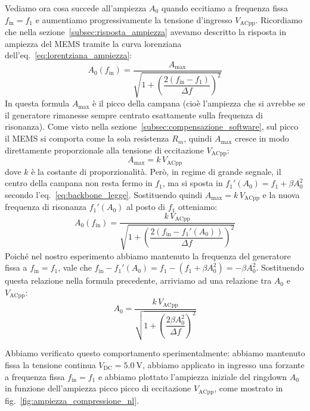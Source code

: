 \documentclass[11pt,a4paper]{article}
\begin{document}
\vspace{0.3cm}
\noindent Vediamo ora cosa succede all'ampiezza $A_0$ quando eccitiamo a frequenza fissa $f_{\text{in}} = f_1$ e aumentiamo progressivamente la tensione d'ingresso $V_{\text{ACpp}}$. Ricordiamo che nella sezione~\ref{subsec:risposta_ampiezza} avevamo descritto la risposta in ampiezza del MEMS tramite la curva lorenziana dell'eq.~\eqref{eq:lorentziana_ampiezza}:
\begin{equation}
    \label{eq:richiamo_lorentz_nl}
    A_0(f_{\text{in}}) = \frac{A_{\max}}{\sqrt{1 + \left( \dfrac{2(f_{\text{in}} - f_1)}{\Delta f} \right)^2}}
\end{equation}
In questa formula $A_{\max}$ è il picco della campana (cioè l'ampiezza che si avrebbe se il generatore rimanesse sempre centrato esattamente sulla frequenza di risonanza). Come visto nella sezione~\ref{subsec:compensazione_software}, sul picco il MEMS si comporta come la sola resistenza $R_m$, quindi $A_{\max}$ cresce in modo direttamente proporzionale alla tensione di eccitazione $V_{\text{ACpp}}$:
\begin{equation}
    \label{eq:amax_lineare_vac}
    A_{\max} = k \, V_{\text{ACpp}}
\end{equation}
dove $k$ è la costante di proporzionalità. Però, in regime di grande segnale, il centro della campana non resta fermo in $f_1$, ma si sposta in $f_1'(A_0) = f_1 + \beta A_0^2$ secondo l'eq.~\eqref{eq:backbone_legge}. Sostituendo quindi $A_{\max} = k \, V_{\text{ACpp}}$ e la nuova frequenza di risonanza $f_1'(A_0)$ al posto di $f_1$ otteniamo:
\begin{equation}
    A_0(f_{\text{in}}) = \frac{k \, V_{\text{ACpp}}}{\sqrt{1 + \left( \dfrac{2\left(f_{\text{in}} - f_1'(A_0)\right)}{\Delta f} \right)^2}}
\end{equation}
Poiché nel nostro esperimento abbiamo mantenuto la frequenza del generatore fissa a $f_{\text{in}} = f_1$, vale che $f_{\text{in}} - f_1'(A_0) = f_1 - (f_1 + \beta A_0^2) = -\beta A_0^2$. Sostituendo questa relazione nella formula precedente, arriviamo ad una relazione tra $A_0$ e $V_{\text{ACpp}}$:
\begin{equation}
    \label{eq:compressione_ampiezza_nl}
    A_0 = \frac{k \, V_{\text{ACpp}}}{\sqrt{1 + \left( \dfrac{2 \beta A_0^2}{\Delta f} \right)^2}}
\end{equation}
\newpage

\noindent Abbiamo verificato questo comportamento sperimentalmente: abbiamo mantenuto fissa la tensione continua $V_{\text{DC}} = \SI{5.0}{\volt}$, abbiamo applicato in ingresso una forzante a frequenza fissa $f_{\text{in}} = f_1$ e abbiamo plottato l'ampiezza iniziale del ringdown $A_0$ in funzione dell'ampiezza picco picco di eccitazione $V_{\text{ACpp}}$, come mostrato in fig.~\ref{fig:ampiezza_compressione_nl}.
\end{document}

